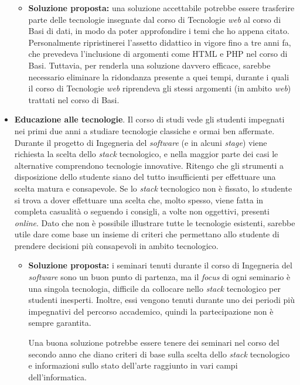\begin{itemize}
\begin{itemize}[leftmargin=*, labelsep=0pt, leftmargin=0pt]
			\item[] \textbf{Soluzione proposta:}  una soluzione accettabile potrebbe essere trasferire parte delle tecnologie insegnate dal corso di Tecnologie \textit{web} al corso di Basi di dati, in modo da poter approfondire i temi che ho appena citato. Personalmente ripristinerei l'assetto didattico in vigore fino a tre anni fa, che prevedeva l'inclusione di argomenti come HTML e PHP nel corso di Basi. Tuttavia, per renderla una soluzione davvero efficace, sarebbe necessario eliminare la ridondanza presente a quei tempi, durante i quali il corso di Tecnologie \textit{web} riprendeva gli stessi argomenti (in ambito \textit{web}) trattati nel corso di Basi.
		\end{itemize}
		\item \textbf{Educazione alle tecnologie}. Il corso di studi vede gli studenti impegnati nei primi due anni a studiare tecnologie classiche e ormai ben affermate. Durante il progetto di Ingegneria del \textit{software} (e in alcuni \textit{stage}) viene richiesta la scelta dello \textit{stack} tecnologico, e nella maggior parte dei casi le alternative comprendono tecnologie innovative. Ritengo che gli strumenti a disposizione dello studente siano del tutto insufficienti per effettuare una scelta matura e consapevole. Se lo \textit{stack} tecnologico non è fissato, lo studente si trova a dover effettuare una scelta che, molto spesso, viene fatta in completa casualità o seguendo i consigli, a volte non oggettivi, presenti \textit{online}. Dato che non è possibile illustrare tutte le tecnologie esistenti, sarebbe utile dare come base un insieme di criteri che permettano allo studente di prendere decisioni più consapevoli in ambito tecnologico.
		\begin{itemize}[leftmargin=*, labelsep=0pt, leftmargin=0pt]
			\item[] \textbf{Soluzione proposta:} i seminari tenuti durante il corso di Ingegneria del \textit{software} sono un buon punto di partenza, ma il \textit{focus} di ogni seminario è una singola tecnologia, difficile da collocare nello \textit{stack} tecnologico per studenti inesperti. Inoltre, essi vengono tenuti durante uno dei periodi più impegnativi del percorso accademico, quindi la partecipazione non è sempre garantita.
			
			Una buona soluzione potrebbe essere tenere dei seminari nel corso del secondo anno che diano criteri di base sulla scelta dello \textit{stack} tecnologico e informazioni sullo stato dell'arte raggiunto in vari campi dell'informatica.
		\end{itemize}
		
	\end{itemize}
	
	